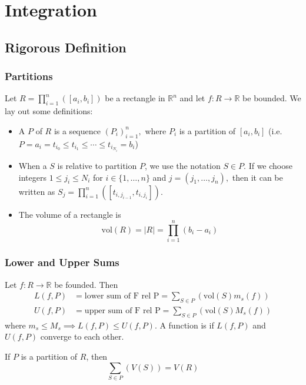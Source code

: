 \documentclass{article}
\numberwithin{equation}{section}
\begin{document}
\newpage
\section{Integration}
\subsection{Rigorous Definition}
\subsubsection{Partitions}
Let $R = \prod_{i=1}^n\left([a_i,b_i]\right)$ be a rectangle in $\mathbb{R}^n$ and let $f:R\to\mathbb{R}$ be bounded. We lay out some definitions:
\begin{itemize}
    \item A  $P$ of $R$ is a sequence $(P_i)^n_{i=1},$ where $P_i$ is a partition of $[a_i,b_i]$ (i.e. $P=a_i=t_{i_0}\le t_{i_1}\le \cdots \le t_{i_{N_i}}=b_i$)
    \item When a  $S$ is relative to partition $P$, we use the notation $S \in P$. If we choose integers $1\le j_i \le N_i$ for $i\in \{1,\dots,n\}$ and $j=(j_1,\dots,j_n),$ then it can be written as $S_j = \prod_{i=1}^n([t_{i,j_{i-1}},t_{i,j_i}])$.
    \item The volume of a rectangle is
    \begin{equation}
        \text{vol}(R) = |R| = \prod_{i=1}^n(b_i-a_i)
    \end{equation}
\end{itemize}
\subsubsection{Lower and Upper Sums}
Let $f:R\to \mathbb{R}$ be founded. Then
\begin{align}
    L(f,P) &= \text{lower sum of F rel P} = \sum_{S \in P}(\text{vol}(S) m_s(f)) \\ 
    U(f,P) &= \text{upper sum of F rel P} = \sum_{S \in P}(\text{vol}(S) M_s(f))
\end{align}
where $m_s \le M_s \implies L(f,P) \le U(f,P)$. A function is  if $L(f,P)$ and $U(f,P)$ converge to each other.
\begin{proposition}
    If $P$ is a partition of $R$, then
    \begin{equation}
        \sum_{S\in P}(V(S)) = V(R)
    \end{equation}
\end{proposition}
\end{document}
